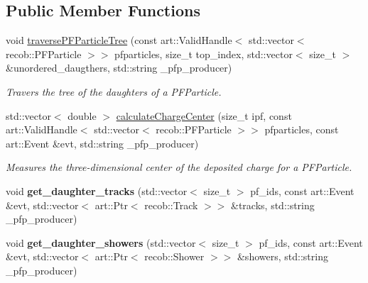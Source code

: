 \subsection*{Public Member Functions}
\begin{DoxyCompactItemize}
\item 
void \hyperlink{classlee_1_1PandoraInterfaceHelper_a5f3e6eecea4f75ea9eea31e520b4f0bc}{traverse\-P\-F\-Particle\-Tree} (const art\-::\-Valid\-Handle$<$ std\-::vector$<$ recob\-::\-P\-F\-Particle $>$$>$ pfparticles, size\-\_\-t top\-\_\-index, std\-::vector$<$ size\-\_\-t $>$ \&unordered\-\_\-daugthers, std\-::string \-\_\-pfp\-\_\-producer)
\begin{DoxyCompactList}\small\item\em Travers the tree of the daughters of a P\-F\-Particle. \end{DoxyCompactList}\item 
std\-::vector$<$ double $>$ \hyperlink{classlee_1_1PandoraInterfaceHelper_a367b3ad86924343d3ab54fa8c84091af}{calculate\-Charge\-Center} (size\-\_\-t ipf, const art\-::\-Valid\-Handle$<$ std\-::vector$<$ recob\-::\-P\-F\-Particle $>$$>$ pfparticles, const art\-::\-Event \&evt, std\-::string \-\_\-pfp\-\_\-producer)
\begin{DoxyCompactList}\small\item\em Measures the three-\/dimensional center of the deposited charge for a P\-F\-Particle. \end{DoxyCompactList}\item 
\hypertarget{classlee_1_1PandoraInterfaceHelper_a30273cdf4f136187b522c237e61b864e}{void {\bfseries get\-\_\-daughter\-\_\-tracks} (std\-::vector$<$ size\-\_\-t $>$ pf\-\_\-ids, const art\-::\-Event \&evt, std\-::vector$<$ art\-::\-Ptr$<$ recob\-::\-Track $>$$>$ \&tracks, std\-::string \-\_\-pfp\-\_\-producer)}\label{classlee_1_1PandoraInterfaceHelper_a30273cdf4f136187b522c237e61b864e}

\item 
\hypertarget{classlee_1_1PandoraInterfaceHelper_a2219037e4e0677d9aeb55e9615b19131}{void {\bfseries get\-\_\-daughter\-\_\-showers} (std\-::vector$<$ size\-\_\-t $>$ pf\-\_\-ids, const art\-::\-Event \&evt, std\-::vector$<$ art\-::\-Ptr$<$ recob\-::\-Shower $>$$>$ \&showers, std\-::string \-\_\-pfp\-\_\-producer)}\label{classlee_1_1PandoraInterfaceHelper_a2219037e4e0677d9aeb55e9615b19131}


\end{DoxyCompactItemize}
